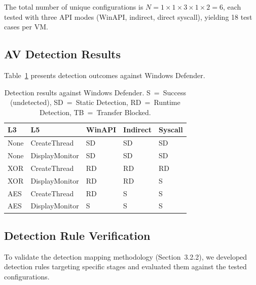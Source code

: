 \documentclass[10pt,a4paper,twocolumn]{article}
\begin{document}
The total number of unique configurations is $N = 1 \times 1 \times 3 \times 1 \times 2 = 6$, each tested with three API modes (WinAPI, indirect, direct syscall), yielding 18 test cases per VM.


\subsection{AV Detection Results}

Table~\ref{tab:results} presents detection outcomes against Windows Defender.

\begin{table}[htbp]
    \centering
    \caption{Detection results against Windows Defender. S~=~Success (undetected), SD~=~Static Detection, RD~=~Runtime Detection, TB~=~Transfer Blocked.}
    \label{tab:results}
    \small
    \begin{tabular}{@{}lllll@{}}
        \toprule
        \textbf{L3} & \textbf{L5} & \textbf{WinAPI} & \textbf{Indirect} & \textbf{Syscall} \\
        \midrule
        None   & CreateThread   & SD & SD & SD \\
        None   & DisplayMonitor & SD & SD & SD \\
        XOR    & CreateThread   & RD & RD & RD \\
        XOR    & DisplayMonitor & RD & RD & S  \\
        AES    & CreateThread   & RD & S  & S  \\
        AES    & DisplayMonitor & S  & S  & S  \\
        \bottomrule
    \end{tabular}
\end{table}


\subsection{Detection Rule Verification}

To validate the detection mapping methodology (Section~3.2.2), we developed detection rules targeting specific stages and evaluated them against the tested configurations.
\end{document}
